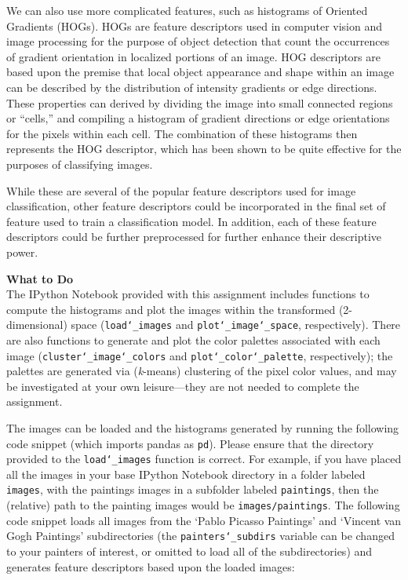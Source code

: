 \documentclass[paper=a4, fontsize=11pt]{scrartcl} %
\numberwithin{equation}{section} %
\numberwithin{figure}{section} %
\numberwithin{table}{section} %
\begin{document}
\vspace{6pt}

We can also use more complicated features, such as histograms of Oriented Gradients (HOGs). HOGs are feature descriptors used in computer vision and image processing for the purpose of object detection that count the occurrences of gradient orientation in localized portions of an image. HOG descriptors are based upon the premise that local object appearance and shape within an image can be described by the distribution of intensity gradients or edge directions. These properties can derived by dividing the image into small connected regions or ``cells,'' and compiling a histogram of gradient directions or edge orientations for the pixels within each cell. The combination of these histograms then represents the HOG descriptor, which has been shown to be quite effective for the purposes of classifying images.

\vspace{6pt}

While these are several of the popular feature descriptors used for image classification, other feature descriptors could be incorporated in the final set of feature used to train a classification model. In addition, each of these feature descriptors could be further preprocessed for further enhance their descriptive power.

\vspace{8pt}

\textbf{What to Do}\\
The IPython Notebook provided with this assignment includes functions to compute the histograms and plot the images within the transformed (2-dimensional) space (\texttt{load\char`_images} and \texttt{plot\char`_image\char`_space}, respectively). There are also functions to generate and plot the color palettes associated with each image (\texttt{cluster\char`_image\char`_colors} and \texttt{plot\char`_color\char`_palette}, respectively); the palettes are generated via (\textit{k}-means) clustering of the pixel color values, and may be investigated at your own leisure---they are not needed to complete the assignment.

\vspace{6pt}

The images can be loaded and the histograms generated by running the following code snippet (which imports pandas as \texttt{pd}). Please ensure that the directory provided to the \texttt{load\char`_images} function is correct. For example, if you have placed all the images in your base IPython Notebook directory in a folder labeled \texttt{images}, with the paintings images in a subfolder labeled \texttt{paintings}, then the (relative) path to the painting images would be \texttt{images/paintings}. The following code snippet loads all images from the `Pablo Picasso Paintings' and `Vincent van Gogh Paintings' subdirectories (the \texttt{painters\char`_subdirs} variable can be changed to your painters of interest, or omitted to load all of the subdirectories) and generates feature descriptors based upon the loaded images:
\end{document}
